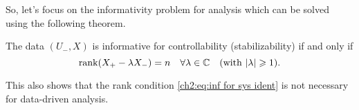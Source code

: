 So, let's focus on the informativity problem for analysis which can be solved using the following theorem.
\begin{theorem}
	\label{ch2:t:contstab}
	The data $(U_-,X)$ is informative for controllability (stabilizability) if and only if 
	\begin{equation}
		\label{ch2:eq:rank for cont}
		\rank ( X_+ -\lambda X_-) = n \quad \forall \lambda \in \mathbb{C} \quad (\textrm{with } |\lambda|\geq 1).
	\end{equation}
\end{theorem}
This also shows that the rank condition \eqref{ch2:eq:inf for sys ident} is not necessary for data-driven analysis.

